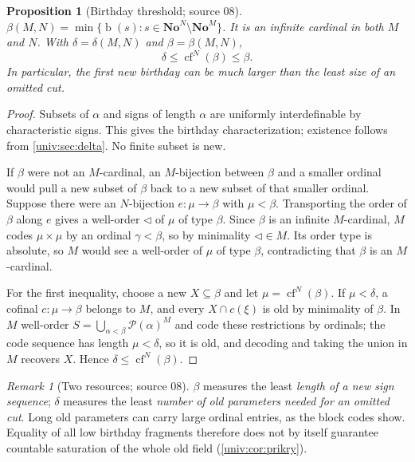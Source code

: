 \documentclass[11pt,letterpaper]{article}
\numberwithin{equation}{section}
\newtheorem{proposition}[proposition]{Proposition}
\theoremstyle{definition}
\theoremstyle{remark}
\newtheorem{remark}[remark]{Remark}
\newcommand{\No}{\mathbf{No}}
\newcommand{\NoM}{\No^{M}}
\newcommand{\NoN}{\No^{N}}
\newcommand{\Pow}{\mathcal P}
\newcommand{\bd}{\operatorname{b}}
\newcommand{\cf}{\operatorname{cf}}
\begin{document}
\begin{proposition}[Birthday threshold; source 08]\label{univ:prop:beta}
$\beta(M,N)=\min\{\bd(s):s\in\NoN\setminus\NoM\}$. It is an infinite cardinal
in both $M$ and $N$. With $\delta=\delta(M,N)$ and $\beta=\beta(M,N)$,
\begin{equation}\label{univ:eq:deltabeta}
 \delta\le\cf^N(\beta)\le\beta.
\end{equation}
In particular, the first new birthday can be much larger than the least size
of an omitted cut.
\end{proposition}
\begin{proof}
Subsets of $\alpha$ and signs of length $\alpha$ are uniformly interdefinable
by characteristic signs. This gives the birthday characterization; existence
follows from \cref{univ:sec:delta}. No finite subset is new.

If $\beta$ were not an $M$-cardinal, an $M$-bijection between $\beta$ and a
smaller ordinal would pull a new subset of $\beta$ back to a new subset of that
smaller ordinal. Suppose there were an $N$-bijection $e:\mu\to\beta$ with
$\mu<\beta$. Transporting the order of $\beta$ along $e$ gives a well-order
$\triangleleft$ of $\mu$ of type $\beta$. Since $\beta$ is an infinite
$M$-cardinal, $M$ codes $\mu\times\mu$ by an ordinal $\gamma<\beta$, so by
minimality $\triangleleft\in M$. Its order type is absolute, so $M$ would see a
well-order of $\mu$ of type $\beta$, contradicting that $\beta$ is an
$M$-cardinal.

For the first inequality, choose a new $X\subseteq\beta$ and let
$\mu=\cf^N(\beta)$. If $\mu<\delta$, a cofinal $c:\mu\to\beta$ belongs to $M$,
and every $X\cap c(\xi)$ is old by minimality of $\beta$. In $M$ well-order
$S=\bigcup_{\alpha<\beta}\Pow(\alpha)^M$ and code these restrictions by
ordinals; the code sequence has length $\mu<\delta$, so it is old, and
decoding and taking the union in $M$ recovers $X$. Hence
$\delta\le\cf^N(\beta)$.
\end{proof}

\begin{remark}[Two resources; source 08]
$\beta$ measures the least \emph{length of a new sign sequence}; $\delta$
measures the least \emph{number of old parameters needed for an omitted cut}.
Long old parameters can carry large ordinal entries, as the block codes show.
Equality of all low birthday fragments therefore does not by itself guarantee
countable saturation of the whole old field (\cref{univ:cor:prikry}).
\end{remark}
\end{document}
